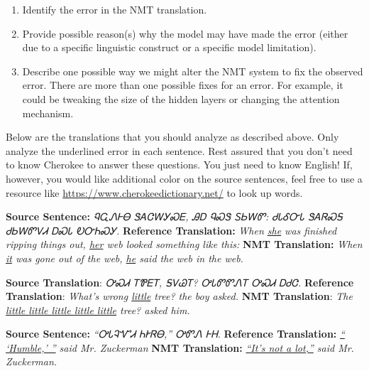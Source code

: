 \begin{parts}
    \begin{enumerate}
        \item Identify the error in the NMT translation.
        \item Provide possible reason(s) why the model may have made the error (either due to a specific linguistic construct or a specific model limitation).
        \item Describe one possible way we might alter the NMT system to fix the observed error. There are more than one possible fixes for an error. For example, it could be tweaking the size of the hidden layers or changing the attention mechanism.
    \end{enumerate}

    Below are the translations that you should analyze as described above. Only analyze the underlined error in each sentence. Rest assured that you don't need to know Cherokee to answer these questions. You just need to know English! If, however, you would like additional color on the source sentences, feel free to use a resource like \url{https://www.cherokeedictionary.net/} to look up words.

    \begin{subparts}
        \subpart[2]
        \textbf{Source Sentence:} \textit{{\cherokeefam ᏄᏩᏁᎰᎾ ᏕᎪᏣᎳᎩᏍᎬ, ᎯᎠ ᏄᏍᏕ ᏚᏏᎳᏛ: ᏧᏓᎴᏅᏓ ᏕᎪᏒᏍᎦ ᏧᏏᎳᏛᏙᏗ ᎠᏍᏓ ᎧᏅᏂᏍᎩ.        }}\newline
        \textbf{Reference Translation:} \textit{When \underline{she} was finished ripping things out, \underline{her} web looked something like this: }\newline
        \textbf{NMT Translation:} \textit{When \underline{it} was gone out of the web, \underline{he} said the web in the web.}

        \subpart[2]
        \textbf{Source Translation}: \textit{{\cherokeefam ᎤᏍᏗ ᎢᏈᎬᎢ, ᎦᏙᏊᎢ? ᎤᏓᏛᏛᏁᎢ ᎤᏍᏗ ᎠᏧᏣ.}}\newline
        \textbf{Reference Translation}: \textit{What's wrong \underline{little} tree? the boy asked.}\newline
        \textbf{NMT Translation}: \textit{ The \underline{little little little little little} tree? asked him.}

        \subpart[2]
        \textbf{Source Sentence:} \textit{{\cherokeefam “ᎤᏓᎸᏉᏗ ᏂᎨᏒᎾ,” ᎤᏛᏁ ᎰᎻ.}}\newline
        \textbf{Reference Translation:} \textit{\underline{“ ‘Humble,’ ”} said Mr. Zuckerman}\newline
        \textbf{NMT Translation:} \textit{\underline{“It’s not a lot,”} said Mr. Zuckerman.}
    \end{subparts}


\end{parts}

